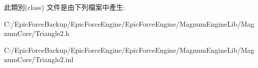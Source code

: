 此類別(class) 文件是由下列檔案中產生\+:\begin{DoxyCompactItemize}
\item 
C\+:/\+Epic\+Force\+Backup/\+Epic\+Force\+Engine/\+Epic\+Force\+Engine/\+Magnum\+Engine\+Lib/\+Magnum\+Core/Triangle2.\+h\item 
C\+:/\+Epic\+Force\+Backup/\+Epic\+Force\+Engine/\+Epic\+Force\+Engine/\+Magnum\+Engine\+Lib/\+Magnum\+Core/Triangle2.\+inl\end{DoxyCompactItemize}

